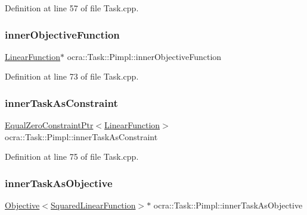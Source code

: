 Definition at line 57 of file Task.\+cpp.

\hypertarget{structocra_1_1Task_1_1Pimpl_a1af1ebecf090dacfa6f25164857b2437}{}\label{structocra_1_1Task_1_1Pimpl_a1af1ebecf090dacfa6f25164857b2437} 
\subsubsection{\texorpdfstring{inner\+Objective\+Function}{innerObjectiveFunction}}
{\footnotesize\ttfamily \hyperlink{classocra_1_1LinearFunction}{Linear\+Function}$\ast$ ocra\+::\+Task\+::\+Pimpl\+::inner\+Objective\+Function}



Definition at line 73 of file Task.\+cpp.

\hypertarget{structocra_1_1Task_1_1Pimpl_ae4b95f72f96a2740186e49920e7672ad}{}\label{structocra_1_1Task_1_1Pimpl_ae4b95f72f96a2740186e49920e7672ad} 
\subsubsection{\texorpdfstring{inner\+Task\+As\+Constraint}{innerTaskAsConstraint}}
{\footnotesize\ttfamily \hyperlink{classocra_1_1EqualZeroConstraintPtr}{Equal\+Zero\+Constraint\+Ptr}$<$\hyperlink{classocra_1_1LinearFunction}{Linear\+Function}$>$ ocra\+::\+Task\+::\+Pimpl\+::inner\+Task\+As\+Constraint}



Definition at line 75 of file Task.\+cpp.

\hypertarget{structocra_1_1Task_1_1Pimpl_a8b5dfe1995ff26df2c0505195da5c305}{}\label{structocra_1_1Task_1_1Pimpl_a8b5dfe1995ff26df2c0505195da5c305} 
\subsubsection{\texorpdfstring{inner\+Task\+As\+Objective}{innerTaskAsObjective}}
{\footnotesize\ttfamily \hyperlink{classocra_1_1Objective}{Objective}$<$\hyperlink{classocra_1_1SquaredLinearFunction}{Squared\+Linear\+Function}$>$$\ast$ ocra\+::\+Task\+::\+Pimpl\+::inner\+Task\+As\+Objective}



